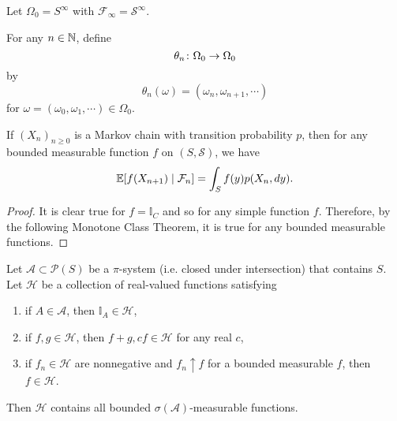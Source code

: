 \noindent Let $\Omega_0 = S^\infty$ with $\mathcal{F}_\infty = \mathcal{S}^\infty$. 

\begin{defn}
    For any $n \in \mathbb{N}$, define
    \begin{equation*}
        \theta_n \colon \Omega_0 \rightarrow \Omega_0
    \end{equation*}
    by
    \begin{equation*}
        \theta_n(\omega) = (\omega_n,\omega_{n+1},\cdots)
    \end{equation*}
    for $\omega=(\omega_0,\omega_1,\cdots) \in \Omega_0$.
\end{defn}

\begin{prop}
    If $(X_n)_{n \geq 0}$ is a Markov chain with transition probability $p$, then for any bounded measurable function $f$ on $(S,\mathcal{S})$, we have
    \begin{equation*}
        \mathbb{E}[f(X_{n+1}) \mid \mathcal{F}_n] = \int_S f(y) p(X_n,dy).
    \end{equation*}
\end{prop}
\begin{proof}
    It is clear true for $f = \mathbb{I}_C$ and so for any simple function $f$. Therefore, by the following Monotone Class Theorem, it is true for any bounded measurable functions.
\end{proof}

\begin{thm}
    Let $\mathcal{A} \subset \mathcal{P}(S)$ be a $\pi$-system (i.e. closed under intersection) that contains $S$. Let $\mathcal{H}$ be a collection of real-valued functions satisfying 
    \begin{enumerate}[label=(\arabic{*})]
        \item if $A \in \mathcal{A}$, then $\mathbb{I}_A \in \mathcal{H}$,
        \item if $f,g \in \mathcal{H}$, then $f+g, cf \in \mathcal{H}$ for any real $c$,
        \item if $f_n \in \mathcal{H}$ are nonnegative and $f_n \uparrow f$ for a bounded measurable $f$, then $f \in \mathcal{H}$.
    \end{enumerate}
    Then $\mathcal{H}$ contains all bounded $\sigma(\mathcal{A})$-measurable functions.
\end{thm}

